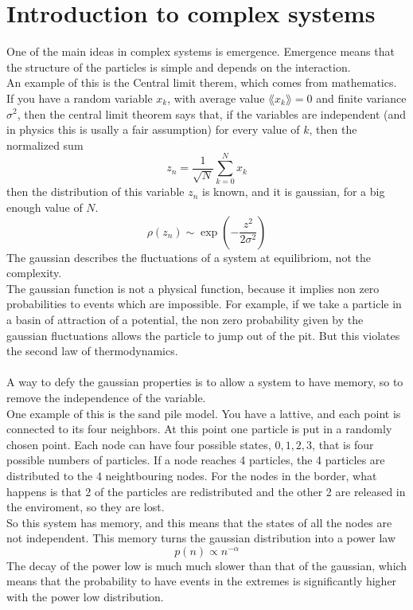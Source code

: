 \section{Introduction to complex systems}
One of the main ideas in complex systems is emergence. Emergence means that the structure of the particles is simple and depends on the interaction. \\
An example of this is the Central limit therem, which comes from mathematics. \\
If you have a random variable $x_k$, with average value $\lang x_k \rang = 0$ and finite variance $\sigma^2$, then the central limit theorem says that, if the variables are independent (and in physics this is usally a fair assumption) for every value of $k$, then the normalized sum 
$$
	z_n = \frac{1}{\sqrt{N}}\sum_{k=0}^N x_k
$$
then the distribution of this variable $z_n$ is known, and it is gaussian, for a big enough value of $N$.
$$
	\rho(z_n) \sim \exp\left(-\frac{z^2}{2\sigma^2}\right)
$$
The gaussian describes the fluctuations of a system at equilibriom, not the complexity. \\
The gaussian function is not a physical function, because it implies non zero probabilities to events which are impossible. For example, if we take a particle in a basin of attraction of a potential, the non zero probability given by the gaussian fluctuations allows the particle to jump out of the pit. But this violates the second law of thermodynamics. \\ \\
A way to defy the gaussian properties is to allow a system to have memory, so to remove the independence of the variable. \\
One example of this is the sand pile model. You have a lattive, and each point is connected to its four neighbors. At this point one particle is put in a randomly chosen point. Each node can have four possible states, $0,1,2,3$, that is four possible numbers of particles. If a node reaches 4 particles, the 4 particles are distributed to the 4 neightbouring nodes. For the nodes in the border, what happens is that 2 of the particles are redistributed and the other 2 are released in the enviroment, so they are lost. \\
So this system has memory, and this means that the states of all the nodes are not independent. This memory turns the gaussian distribution into a power law
$$
	p(n) \propto n^{-\alpha}
$$
The decay of the power low is much much slower than that of the gaussian, which means that the probability to have events in the extremes is significantly higher with the power low distribution.
